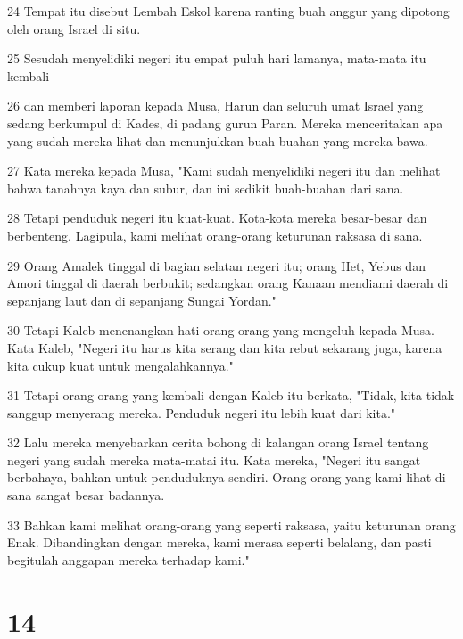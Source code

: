 \par 24 Tempat itu disebut Lembah Eskol karena ranting buah anggur yang dipotong oleh orang Israel di situ.
\par 25 Sesudah menyelidiki negeri itu empat puluh hari lamanya, mata-mata itu kembali
\par 26 dan memberi laporan kepada Musa, Harun dan seluruh umat Israel yang sedang berkumpul di Kades, di padang gurun Paran. Mereka menceritakan apa yang sudah mereka lihat dan menunjukkan buah-buahan yang mereka bawa.
\par 27 Kata mereka kepada Musa, "Kami sudah menyelidiki negeri itu dan melihat bahwa tanahnya kaya dan subur, dan ini sedikit buah-buahan dari sana.
\par 28 Tetapi penduduk negeri itu kuat-kuat. Kota-kota mereka besar-besar dan berbenteng. Lagipula, kami melihat orang-orang keturunan raksasa di sana.
\par 29 Orang Amalek tinggal di bagian selatan negeri itu; orang Het, Yebus dan Amori tinggal di daerah berbukit; sedangkan orang Kanaan mendiami daerah di sepanjang laut dan di sepanjang Sungai Yordan."
\par 30 Tetapi Kaleb menenangkan hati orang-orang yang mengeluh kepada Musa. Kata Kaleb, "Negeri itu harus kita serang dan kita rebut sekarang juga, karena kita cukup kuat untuk mengalahkannya."
\par 31 Tetapi orang-orang yang kembali dengan Kaleb itu berkata, "Tidak, kita tidak sanggup menyerang mereka. Penduduk negeri itu lebih kuat dari kita."
\par 32 Lalu mereka menyebarkan cerita bohong di kalangan orang Israel tentang negeri yang sudah mereka mata-matai itu. Kata mereka, "Negeri itu sangat berbahaya, bahkan untuk penduduknya sendiri. Orang-orang yang kami lihat di sana sangat besar badannya.
\par 33 Bahkan kami melihat orang-orang yang seperti raksasa, yaitu keturunan orang Enak. Dibandingkan dengan mereka, kami merasa seperti belalang, dan pasti begitulah anggapan mereka terhadap kami."

\chapter{14}

